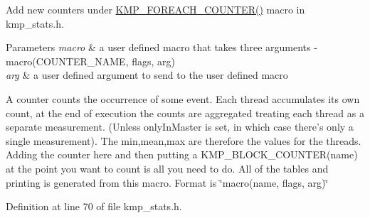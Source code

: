 Add new counters under \hyperlink{group__STATS__GATHERING_ga49fb18e6ba9abac7dcf1f9a202741b66}{K\-M\-P\-\_\-\-F\-O\-R\-E\-A\-C\-H\-\_\-\-C\-O\-U\-N\-T\-E\-R()} macro in kmp\-\_\-stats.\-h. 


\begin{DoxyParams}{Parameters}
{\em macro} & a user defined macro that takes three arguments -\/ macro(\-C\-O\-U\-N\-T\-E\-R\-\_\-\-N\-A\-M\-E, flags, arg) \\
\hline
{\em arg} & a user defined argument to send to the user defined macro\\
\hline
\end{DoxyParams}
A counter counts the occurrence of some event. Each thread accumulates its own count, at the end of execution the counts are aggregated treating each thread as a separate measurement. (Unless only\-In\-Master is set, in which case there's only a single measurement). The min,mean,max are therefore the values for the threads. Adding the counter here and then putting a K\-M\-P\-\_\-\-B\-L\-O\-C\-K\-\_\-\-C\-O\-U\-N\-T\-E\-R(name) at the point you want to count is all you need to do. All of the tables and printing is generated from this macro. Format is \char`\"{}macro(name, flags, arg)\char`\"{} 

Definition at line 70 of file kmp\-\_\-stats.\-h.

